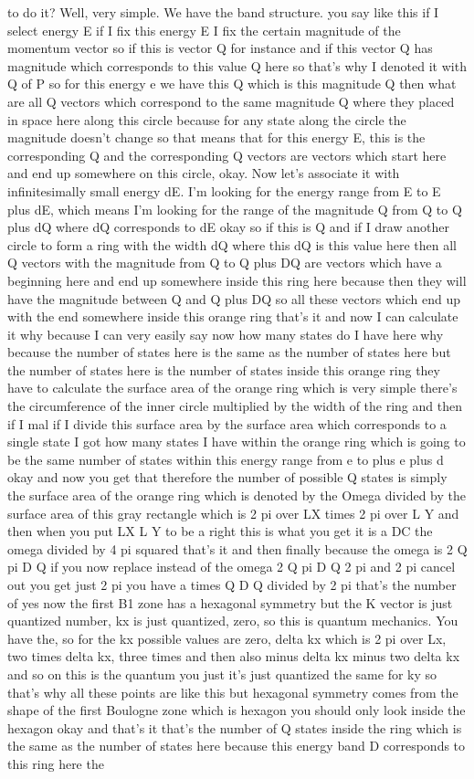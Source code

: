 to do it? Well, very simple. We have the band structure. you say like this if I select energy E if I fix this energy E I fix the certain magnitude of the momentum vector so if this is vector Q for instance and if this vector Q has magnitude which corresponds to this value Q here so that's why I denoted it with Q of P so for this energy e we have this Q which is this magnitude Q then what are all Q vectors which correspond to the same magnitude Q where they placed in space here along this circle because for any state along the circle the magnitude doesn't change so that means that for this energy E, this is the corresponding Q and the corresponding Q vectors are vectors which start here and end up somewhere on this circle, okay. Now let's associate it with infinitesimally small energy dE. I'm looking for the energy range from E to E plus dE, which means I'm looking for the range of the magnitude Q from Q to Q plus dQ where dQ corresponds to dE okay so if this is Q and if I draw another circle to form a ring with the width dQ where this dQ is this value here then all Q vectors with the magnitude from Q to Q plus DQ are vectors which have a beginning here and end up somewhere inside this ring here because then they will have the magnitude between Q and Q plus DQ so all these vectors which end up with the end somewhere inside this orange ring that's it and now I can calculate it why because I can very easily say now how many states do I have here why because the number of states here is the same as the number of states here but the number of states here is the number of states inside this orange ring they have to calculate the surface area of the orange ring which is very simple there's the circumference of the inner circle multiplied by the width of the ring and then if I mal if I divide this surface area by the surface area which corresponds to a single state I got how many states I have within the orange ring which is going to be the same number of states within this energy range from e to plus e plus d okay and now you get that therefore the number of possible Q states is simply the surface area of the orange ring which is denoted by the Omega divided by the surface area of this gray rectangle which is 2 pi over LX times 2 pi over L Y and then when you put LX L Y to be a right this is what you get it is a DC the omega divided by 4 pi squared that's it and then finally because the omega is 2 Q pi D Q if you now replace instead of the omega 2 Q pi D Q 2 pi and 2 pi cancel out you get just 2 pi you have a times Q D Q divided by 2 pi that's the number of yes now the first B1 zone has a hexagonal symmetry but the K vector is just quantized number, kx is just quantized, zero, so this is quantum mechanics. You have the, so for the kx possible values are zero, delta kx which is 2 pi over Lx, two times delta kx, three times and then also minus delta kx minus two delta kx and so on this is the quantum you just it's just quantized the same for ky so that's why all these points are like this but hexagonal symmetry comes from the shape of the first Boulogne zone which is hexagon you should only look inside the hexagon okay and that's it that's the number of Q states inside the ring which is the same as the number of states here because this energy band D corresponds to this ring here the 
